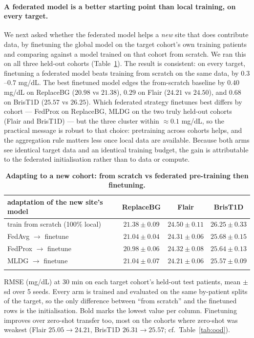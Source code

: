 \documentclass[10pt,letterpaper]{article}
\newlength\savedwidth
\newcommand\thickhline{\noalign{\global\savedwidth\arrayrulewidth\global\arrayrulewidth 2pt}%
\hline
\noalign{\global\arrayrulewidth\savedwidth}}
\begin{document}
\paragraph{A federated model is a better starting point than local training, on
every target.} We next asked whether the federated model helps a \emph{new} site
that does contribute data, by finetuning the global model on the target cohort's
own training patients and comparing against a model trained on that cohort from
scratch. We ran this on all three held-out cohorts (Table~\ref{tab:finetune}). The
result is consistent: on every target, finetuning a federated model beats training
from scratch on the same data, by $0.3$--$0.7$ mg/dL. The best finetuned model
edges the from-scratch baseline by $0.40$ mg/dL on ReplaceBG
($20.98$ vs $21.38$), $0.29$ on Flair ($24.21$ vs $24.50$), and $0.68$ on BrisT1D
($25.57$ vs $26.25$). Which federated strategy finetunes best differs by cohort
--- FedProx on ReplaceBG, MLDG on the two truly held-out cohorts (Flair and
BrisT1D) --- but the three cluster within $\approx 0.1$ mg/dL, so the practical
message is robust to that choice: pretraining across cohorts helps, and the
aggregation rule matters less once local data are available. Because both arms see
identical target data and an identical training budget, the gain is attributable
to the federated initialisation rather than to data or compute.

\begin{table}[!ht]
\centering
\captionsetup{justification=centering,singlelinecheck=on}
\caption{\bf Adapting to a new cohort: from scratch vs federated pre-training then finetuning.}
\label{tab:finetune}
\begin{tabular}{lccc}
\thickhline
adaptation of the new site's model & ReplaceBG & Flair & BrisT1D \\
\hline
train from scratch (100\% local) & $21.38 \pm 0.09$ & $24.50 \pm 0.11$ & $26.25 \pm 0.33$ \\
\hline
FedAvg $\rightarrow$ finetune  & $21.04 \pm 0.04$ & $24.31 \pm 0.06$ & $25.68 \pm 0.15$ \\
FedProx $\rightarrow$ finetune & $\mathbf{20.98 \pm 0.06}$ & $24.32 \pm 0.08$ & $25.64 \pm 0.13$ \\
MLDG $\rightarrow$ finetune    & $21.04 \pm 0.07$ & $\mathbf{24.21 \pm 0.06}$ & $\mathbf{25.57 \pm 0.09}$ \\
\thickhline
\end{tabular}
\begin{center}
{\small RMSE (mg/dL) at 30 min on each target cohort's held-out test patients,
mean $\pm$ sd over 5 seeds. Every arm is trained and evaluated on the same
by-patient splits of the target, so the only difference between ``from scratch''
and the finetuned rows is the initialisation. Bold marks the lowest value per
column. Finetuning improves over zero-shot transfer too, most on the cohorts where
zero-shot was weakest (Flair $25.05\rightarrow24.21$, BrisT1D
$26.31\rightarrow25.57$; cf.\ Table~\ref{tab:ood}).}
\end{center}
\end{table}
\end{document}

